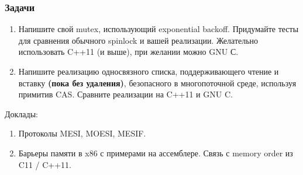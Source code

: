 \documentclass[aspectratio=169, pdf, 8pt, unicode]{beamer}
\begin{document}
\begin{frame}
\frametitle{Задачи}
\begin{enumerate}
\item Напишите свой mutex, использующий exponential backoff. Придумайте тесты для сравнения обычного spinlock и вашей реализации.
   Желательно использовать C++11 (и выше), при желании можно GNU С.
\item Напишите реализацию односвязного списка, поддерживающего чтение и вставку \textbf{(пока без удаления)}, безопасного в многопоточной среде,
   используя примитив CAS. Сравните реализации на C++11 и GNU C.
\end{enumerate}

Доклады:
\begin{enumerate}
\item Протоколы MESI, MOESI, MESIF.
\item Барьеры памяти в x86 с примерами на ассемблере. Связь с memory order из C11 / C++11.
\end{enumerate}

\end{frame}
\end{document}
